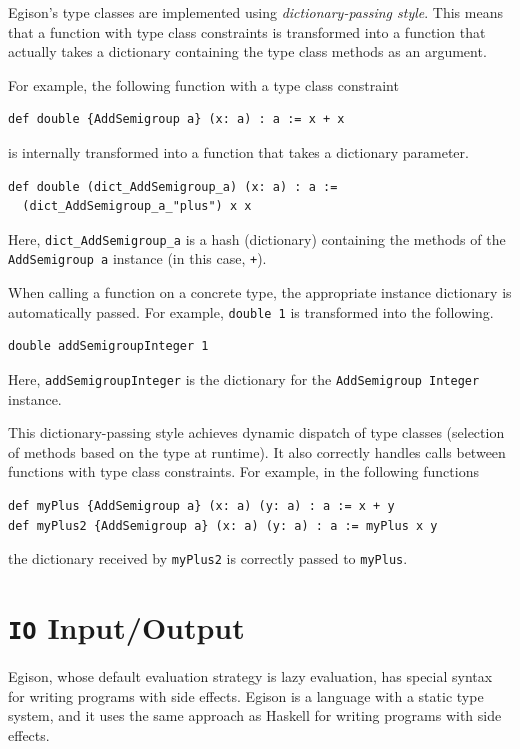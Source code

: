 Egison's type classes are implemented using \emph{dictionary-passing style}.
This means that a function with type class constraints is transformed into a function that actually takes a dictionary containing the type class methods as an argument.

For example, the following function with a type class constraint
\begin{lstlisting}[language=egison,numbers=none]
def double {AddSemigroup a} (x: a) : a := x + x
\end{lstlisting}
is internally transformed into a function that takes a dictionary parameter.
\begin{lstlisting}[language=egison,numbers=none]
def double (dict_AddSemigroup_a) (x: a) : a :=
  (dict_AddSemigroup_a_"plus") x x
\end{lstlisting}
Here, \lstinline{dict_AddSemigroup_a} is a hash (dictionary) containing the methods of the \lstinline{AddSemigroup a} instance (in this case, \lstinline{+}).

When calling a function on a concrete type, the appropriate instance dictionary is automatically passed.
For example, \lstinline{double 1} is transformed into the following.
\begin{lstlisting}[language=egison,numbers=none]
double addSemigroupInteger 1
\end{lstlisting}
Here, \lstinline{addSemigroupInteger} is the dictionary for the \lstinline{AddSemigroup Integer} instance.

This dictionary-passing style achieves dynamic dispatch of type classes (selection of methods based on the type at runtime).
It also correctly handles calls between functions with type class constraints.
For example, in the following functions
\begin{lstlisting}[language=egison,numbers=none]
def myPlus {AddSemigroup a} (x: a) (y: a) : a := x + y
def myPlus2 {AddSemigroup a} (x: a) (y: a) : a := myPlus x y
\end{lstlisting}
the dictionary received by \lstinline{myPlus2} is correctly passed to \lstinline{myPlus}.

\section{\texttt{IO} Input/Output}

Egison, whose default evaluation strategy is lazy evaluation, has special syntax for writing programs with side effects.
Egison is a language with a static type system, and it uses the same approach as Haskell for writing programs with side effects.

